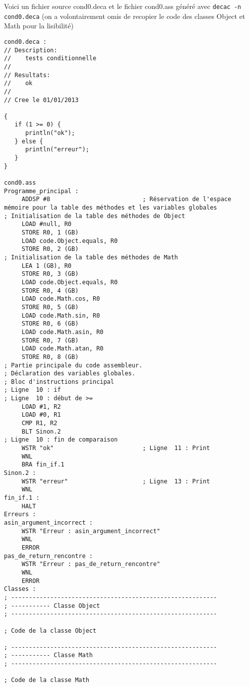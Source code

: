 \documentclass[12pt]{article}
\begin{document}
Voici un fichier source cond0.deca et le fichier cond0.ass généré avec
\lstinline!decac -n cond0.deca! (on a volontairement omis de recopier le code
des classes Object et Math pour la lisibilité)
\begin{verbatim}
cond0.deca :
// Description:
//    tests conditionnelle
//
// Resultats:
//    ok
// 
// Cree le 01/01/2013

{
   if (1 >= 0) {
      println("ok"); 
   } else { 
      println("erreur");
   }
}

cond0.ass
Programme_principal :
     ADDSP #8                          ; Réservation de l'espace mémoire pour la table des méthodes et les variables globales
; Initialisation de la table des méthodes de Object
     LOAD #null, R0
     STORE R0, 1 (GB)
     LOAD code.Object.equals, R0
     STORE R0, 2 (GB)
; Initialisation de la table des méthodes de Math
     LEA 1 (GB), R0
     STORE R0, 3 (GB)
     LOAD code.Object.equals, R0
     STORE R0, 4 (GB)
     LOAD code.Math.cos, R0
     STORE R0, 5 (GB)
     LOAD code.Math.sin, R0
     STORE R0, 6 (GB)
     LOAD code.Math.asin, R0
     STORE R0, 7 (GB)
     LOAD code.Math.atan, R0
     STORE R0, 8 (GB)
; Partie principale du code assembleur.
; Déclaration des variables globales.
; Bloc d'instructions principal
; Ligne  10 : if
; Ligne  10 : début de >= 
     LOAD #1, R2
     LOAD #0, R1
     CMP R1, R2
     BLT Sinon.2
; Ligne  10 : fin de comparaison 
     WSTR "ok"                         ; Ligne  11 : Print
     WNL
     BRA fin_if.1
Sinon.2 :
     WSTR "erreur"                     ; Ligne  13 : Print
     WNL
fin_if.1 :
     HALT
Erreurs :
asin_argument_incorrect :
     WSTR "Erreur : asin_argument_incorrect"
     WNL
     ERROR
pas_de_return_rencontre :
     WSTR "Erreur : pas_de_return_rencontre"
     WNL
     ERROR
Classes :
; ----------------------------------------------------------
; ----------- Classe Object
; ----------------------------------------------------------

; Code de la classe Object

; ----------------------------------------------------------
; ----------- Classe Math
; ----------------------------------------------------------

; Code de la classe Math

\end{verbatim}
\end{document}
